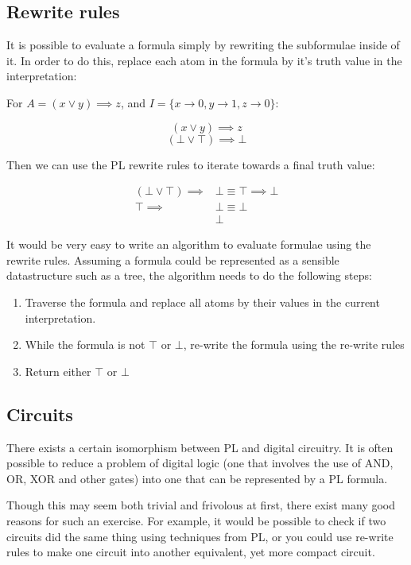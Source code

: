 \subsection{Rewrite rules}

It is possible to evaluate a formula simply by rewriting the subformulae inside
of it. In order to do this, replace each atom in the formula by it's truth value
in the interpretation:

For $A = (x \vee y) \implies z$, and $I = \{x \rightarrow 0, y \rightarrow 1, z
\rightarrow 0\}$:

\[
  (x \vee y) \implies z
\]
\[
  (\bot \vee \top) \implies \bot
\]

Then we can use the PL rewrite rules to iterate towards a final truth value:

\begin{align}
  (\bot \vee \top) \implies &\bot \equiv \top \implies \bot\\
  \top \implies &\bot \equiv \bot\\
  &\boldsymbol{\bot}
\end{align}

It would be very easy to write an algorithm to evaluate formulae using the
rewrite rules. Assuming a formula could be represented as a sensible
datastructure such as a tree, the algorithm needs to do the following steps:

\begin{enumerate}
  \item Traverse the formula and replace all atoms by their values in the
        current interpretation.
  \item While the formula is not $\top$ or $\bot$, re-write the formula using
        the re-write rules
  \item Return either $\top$ or $\bot$
\end{enumerate}

\subsection{Circuits}


There exists a certain isomorphism between PL and digital circuitry. It is
often possible to reduce a problem of digital logic (one that involves the use
of AND, OR, XOR and other gates) into one that can be represented by a PL
formula.

Though this may seem both trivial and frivolous at first, there exist many good
reasons for such an exercise. For example, it would be possible to check if two
circuits did the same thing using techniques from PL, or you could use re-write
rules to make one circuit into another equivalent, yet more compact circuit.

